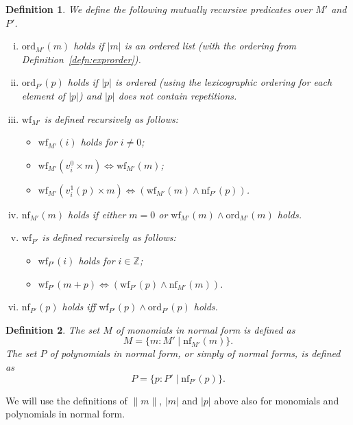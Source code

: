 \documentclass{article}
\newtheorem{definition}{Definition}[section]
\newcommand{\alt}{\mathrel{|}}
\newcommand{\Z}{{\mathbb Z}}
\newcommand{\ord}{\ensuremath{\mathrm{ord}}}
\newcommand{\wf}{\ensuremath{\mathrm{wf}}}
\newcommand{\nf}{\ensuremath{\mathrm{nf}}}
\begin{document}
\begin{definition}\label{def:prenftonf}
We define the following mutually recursive predicates over $M'$ and $P'$.
\begin{enumerate}[(i)]
\item $\ord_{M'}(m)$ holds if $|m|$ is an ordered list (with the ordering
from Definition~\ref{defn:exprorder}).
\item $\ord_{P'}(p)$ holds if $|p|$ is ordered (using the
lexicographic ordering for each element of $|p|$) and $|p|$ does not
contain repetitions.
\item $\wf_{M'}$ is defined recursively as follows:
\begin{itemize}
\item $\wf_{M'}(i)$ holds for $i\neq 0$;
\item $\wf_{M'}(v^0_i\times m)\iff\wf_{M'}(m)$;
\item $\wf_{M'}(v^1_i(p)\times m)\iff(\wf_{M'}(m)\wedge\nf_{P'}(p))$.
\end{itemize}
\item $\nf_{M'}(m)$ holds if either $m=0$ or $\wf_{M'}(m)\wedge\ord_{M'}(m)$
holds.
\item $\wf_{P'}$ is defined recursively as follows:
\begin{itemize}
\item $\wf_{P'}(i)$ holds for $i\in\Z$;
\item $\wf_{P'}(m+p)\iff(\wf_{P'}(p)\wedge\nf_{M'}(m))$.
\end{itemize}
\item $\nf_{P'}(p)$ holds iff $\wf_{P'}(p)\wedge\ord_{P'}(p)$ holds.
\end{enumerate}
\end{definition}

\begin{definition}\label{defn:nf}
The set $M$ of monomials \emph{in normal form} is defined as
\[M = \{m:M' \alt \nf_{M'}(m)\}.\]
The set $P$ of polynomials \emph{in normal form}, or simply of normal forms,
is defined as \[P = \{p:P' \alt \nf_{P'}(p)\}.\]
\end{definition}

We will use the definitions of $\|m\|$, $|m|$ and $|p|$ above also for
monomials and polynomials in normal form.
\end{document}
